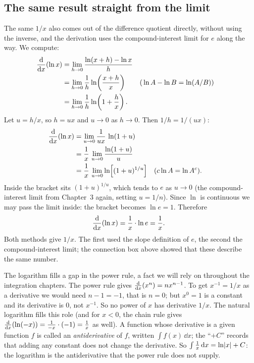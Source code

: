 \subsection{The same result straight from the limit}

The same $1/x$ also comes out of the difference quotient directly,
without using the inverse, and the derivation uses the
compound-interest limit for $e$ along the way. We compute:
\begin{align*}
\frac{\mathrm{d}}{\mathrm{d} x}\!\left(\ln x\right)
&= \lim_{h\to 0}\frac{\ln(x+h)-\ln x}{h} \\
&= \lim_{h\to 0}\frac{1}{h}\ln\!\left(\frac{x+h}{x}\right)
   && \text{(}\ln A - \ln B = \ln(A/B)\text{)} \\
&= \lim_{h\to 0}\frac{1}{h}\ln\!\left(1+\frac{h}{x}\right).
\end{align*}
Let $u = h/x$, so $h = ux$ and $u\to 0$ as $h\to 0$. Then $1/h = 1/(ux)$:
\begin{align*}
\frac{\mathrm{d}}{\mathrm{d} x}\!\left(\ln x\right)
&= \lim_{u\to 0}\frac{1}{ux}\,\ln(1+u) \\
&= \frac{1}{x}\,\lim_{u\to 0}\frac{\ln(1+u)}{u} \\
&= \frac{1}{x}\,\lim_{u\to 0}\ln\!\Big[(1+u)^{1/u}\Big]
   && \text{(}c\ln A = \ln A^{c}\text{)}.
\end{align*}
Inside the bracket sits $(1+u)^{1/u}$, which tends to $e$ as $u\to 0$ (the
compound-interest limit from Chapter~3 again, setting $u=1/n$). Since $\ln$ is
continuous we may pass the limit inside: the bracket becomes $\ln e = 1$. Therefore
\[
   \frac{\mathrm{d}}{\mathrm{d} x}\!\left(\ln x\right) = \frac{1}{x}\cdot \ln e = \frac{1}{x}.
\]
Both methods give $1/x$. The first used the slope definition of $e$, the
second the compound-interest limit; the connection box above showed that these
describe the same number.

\begin{aestheticbox}
The logarithm fills a gap in the power rule, a fact we will rely on throughout the
integration chapters. The power rule gives $\frac{\mathrm{d}}{\mathrm{d} x}\!\left(x^n\right) = n x^{n-1}$. To get
$x^{-1}=1/x$ as a derivative we would need $n-1=-1$, that is $n=0$; but
$x^0=1$ is a constant and its derivative is $0$, not $x^{-1}$. So no power of
$x$ has derivative $1/x$. The natural logarithm fills this role
(and for $x<0$, the chain rule gives $\frac{\mathrm{d}}{\mathrm{d} x}\!\left(\ln(-x)\right) = \tfrac{1}{-x}\cdot(-1) = \tfrac{1}{x}$
as well). A function whose derivative is a given function $f$ is called an
\emph{antiderivative} of $f$, written $\int f(x)\,\dd x$; the ``$+C$'' records
that adding any constant does not change the derivative. So
$\int \frac{1}{x}\,\mathrm{d} x = \ln\lvert x\rvert+C$: the logarithm is the antiderivative
that the power rule does not supply.
\end{aestheticbox}

